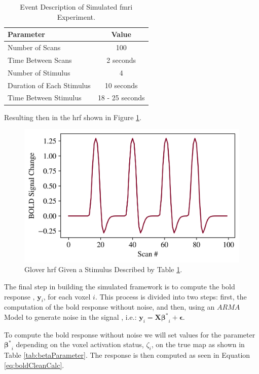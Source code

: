 \begin{table}[htbp!]
\centering
\caption{Event Description of Simulated \gls{fmri} Experiment.}
\begin{tabular}{lc}
\hline
\textbf{Parameter} & \textbf{Value} \\ \hline
Number of Scans & 100 \\
Time Between Scans & 2 seconds \\
Number of Stimulus & 4 \\
Duration of Each Stimulus & 10 seconds \\
Time Between Stimulus & 18 - 25 seconds \\ \hline
\end{tabular}
\label{tab:eventsSim}
\end{table}

Resulting then in the \gls{hrf} shown in Figure \ref{fig:gloverHRF}.

\begin{figure}[htbp!]
\centering
\includegraphics{images/gloverHRF.png}
\caption{Glover \gls{hrf} Given a Stimulus Described by Table \ref{tab:eventsSim}.}
\label{fig:gloverHRF}
\end{figure}

The final step in building the simulated framework is to compute the \gls{bold} response
, $\bm{y}_i$, for each voxel $i$. This process is divided into two steps: first, the 
computation of the \gls{bold} response without noise, and then, using an $ARMA$ Model 
to generate noise in the signal \cite{choi2012arma}, i.e.:
$
\bm{y}_i = \bm{X}\bm{\beta^*}_i + \bm{\epsilon}.
$

To compute the \gls{bold} response without noise we will set values for the parameter 
$\bm{\beta^*}_i$ depending on the voxel activation status, $\zeta_i$, on the true map as 
shown in Table \ref{tab:betaParameter}. The response is then computed as seen in 
Equation \ref{eq:boldCleanCalc}.


